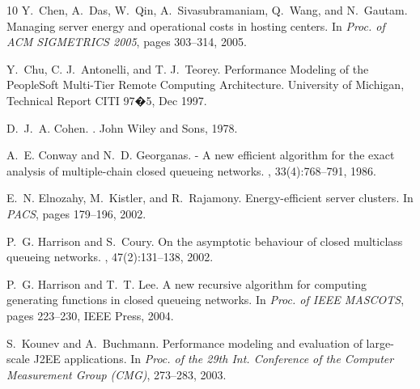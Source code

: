 \documentclass[journal,twocolumn,9.5pt]{IEEEtran}
\begin{document}
\begin{thebibliography}{10}
Y.~Chen, A.~Das, W.~Qin, A.~Sivasubramaniam, Q.~Wang, and N.~Gautam.
\newblock Managing server energy and operational costs in hosting centers.
\newblock In {\em Proc. of ACM SIGMETRICS 2005}, pages 303--314, 2005.


Y.~Chu, C. J.~Antonelli, and T. J.~Teorey.
\newblock Performance Modeling of the PeopleSoft Multi-Tier Remote Computing Architecture.
\newblock University of Michigan, Technical Report CITI 97�5, Dec 1997.

 D.~J.~A. Cohen.
 .
 \newblock John Wiley and Sons, 1978.

A.~E. Conway and N.~D. Georganas.
 - {A} new efficient algorithm for the exact analysis of
  multiple-chain closed queueing networks.
, 33(4):768--791, 1986.



E.~N. Elnozahy, M.~Kistler, and R.~Rajamony.
\newblock Energy-efficient server clusters.
\newblock In {\em PACS}, pages 179--196, 2002.

P.~G. Harrison and S.~Coury.
\newblock On the asymptotic behaviour of closed multiclass queueing networks.
, 47(2):131--138, 2002.

P.~G. Harrison and T.~T. Lee.
\newblock A new recursive algorithm for computing generating functions in
  closed queueing networks.
\newblock In {\em Proc. of IEEE MASCOTS}, pages
  223--230, IEEE Press, 2004.

S.~Kounev and A.~Buchmann.
\newblock Performance modeling and evaluation of large-scale {J2EE} applications.
\newblock In {\em Proc. of the 29th Int. Conference of the Computer
  Measurement Group {(CMG)}}, 273--283, 2003.


\end{thebibliography}
\end{document}
